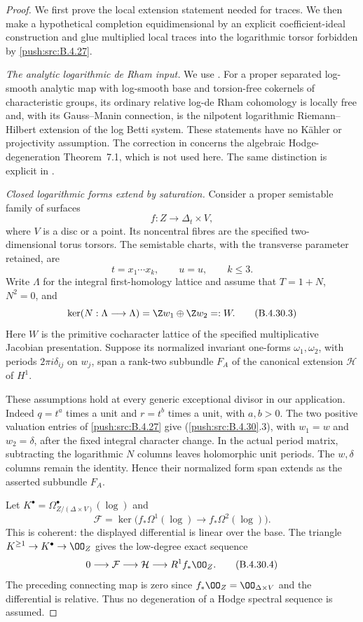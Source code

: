 \begin{proof}
We first prove the local extension statement
needed for traces. We then make a hypothetical
completion equidimensional by an explicit
coefficient-ideal construction and glue multiplied
local traces into the logarithmic torsor
forbidden by \ref{push:src:B.4.27}.

\emph{The analytic logarithmic de Rham input.}
We use \citet[Theorems 6.2 and 6.3,
pp.~32 and 34]{IKN2005E}. For a proper separated
log-smooth analytic map with log-smooth base and
torsion-free cokernels of characteristic groups,
its ordinary relative log-de Rham cohomology is
locally free and, with its Gauss--Manin
connection, is the nilpotent logarithmic
Riemann--Hilbert extension of the log Betti
system. These statements have no K\"ahler or
projectivity assumption. The correction in
\citet{IKN2007ErratumE} concerns the algebraic
Hodge-degeneration Theorem~7.1, which is not
used here. The same distinction is explicit in
\citet[Definition 7.1(i) and Section 9.2,
pp.~164--165 and 173]{KKN2008PicardE}.

\emph{Closed logarithmic forms extend by saturation.}
Consider a proper semistable family of surfaces
\[
 f:Z\longrightarrow\Delta_t\times V,
 \tag{B.4.30.1}
\]
where $V$ is a disc or a point. Its noncentral
fibres are the specified two-dimensional torus
torsors. The semistable charts, with the
transverse parameter retained, are
\[
 t=x_1\cdots x_k,\qquad u=u,\qquad k\le3.
 \tag{B.4.30.2}
\]
Write $\Lambda$ for the integral first-homology
lattice and assume that $T=1+N$, $N^2=0$, and
\[
 \ker(N:\Lambda\longrightarrow\Lambda)
       =\Z w_1\oplus\Z w_2=:W.
 \tag{B.4.30.3}
\]
Here $W$ is the primitive cocharacter lattice
of the specified multiplicative Jacobian
presentation. Suppose its normalized invariant
one-forms $\omega_1,\omega_2$, with periods
$2\pi i\delta_{ij}$ on $w_j$, span a rank-two
subbundle $F_A$ of the canonical extension
$\mathcal H$ of $H^1$.

These assumptions hold at every generic
exceptional divisor in our application. Indeed
$q=t^a$ times a unit and $r=t^b$ times a unit,
with $a,b>0$. The two positive valuation entries
of \ref{push:src:B.4.27} give (\ref{push:src:B.4.30}.3), with $w_1=w$ and
$w_2=\delta$, after the fixed integral character
change. In the actual period matrix, subtracting
the logarithmic $N$ columns leaves holomorphic
unit periods. The $w,\delta$ columns remain
the identity. Hence their normalized form span
extends as the asserted subbundle $F_A$.

Let $K^\bullet=\Omega^\bullet_{Z/(\Delta\times V)}
(\log)$ and
\[
 \mathcal F=\ker\bigl(f_*\Omega^1(\log)
                   \longrightarrow f_*\Omega^2(\log)\bigr).
\]
This is coherent: the displayed differential
is linear over the base. The triangle
$K^{\ge1}\to K^\bullet\to\OO_Z$ gives the
low-degree exact sequence
\[
 0\longrightarrow\mathcal F
 \longrightarrow\mathcal H
 \longrightarrow R^1f_*\OO_Z.
 \tag{B.4.30.4}
\]
The preceding connecting map is zero since
$f_*\OO_Z=\OO_{\Delta\times V}$ and the
differential is relative. Thus no degeneration
of a Hodge spectral sequence is assumed.


\end{proof}
